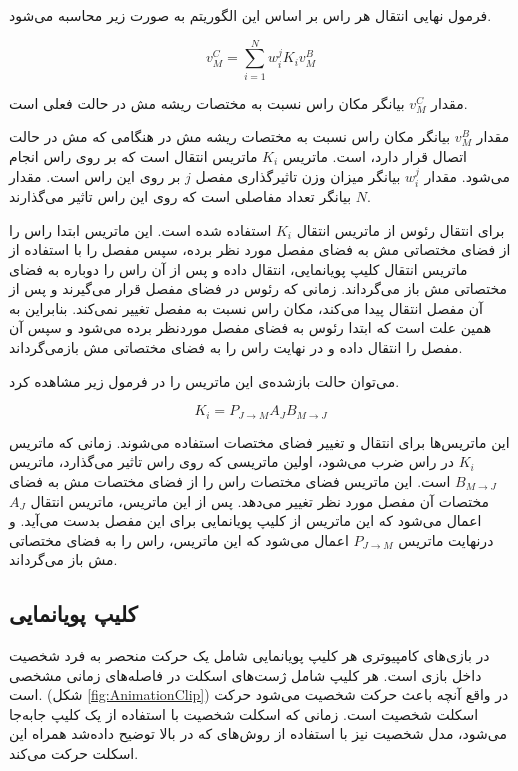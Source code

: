 فرمول نهایی انتقال هر راس بر اساس این الگوریتم به صورت زیر محاسبه می‌شود.

\[ v_M^C = \sum_{i=1}^{N} w_i^j K_i v_M^B \]


مقدار  \( v_M^C \)
بیانگر مکان راس نسبت به مختصات ریشه مش در حالت فعلی است.

مقدار  \( v_M^B \)
بیانگر مکان راس نسبت به مختصات ریشه مش در هنگامی که مش در حالت اتصال قرار دارد، است.
ماتریس \( K_i \)
ماتریس انتقال است که بر روی راس انجام می‌شود.
مقدار \( w_i^j \)
بیانگر میزان وزن تاثیرگذاری مفصل \(j\) 
بر روی این راس است.
مقدار \( N \)
بیانگر تعداد مفاصلی است که روی این راس تاثیر می‌گذارند.


برای انتقال رئوس از ماتریس انتقال \(K_i\) 
استفاده شده است.
این ماتریس ابتدا راس را از فضای مختصاتی مش به فضای مفصل مورد نظر برده، سپس مفصل را با استفاده از ماتریس انتقال کلیپ پویانمایی،
انتقال داده و پس از آن راس را دوباره به فضای مختصاتی مش باز‌ می‌گرداند.
زمانی که رئوس در فضای مفصل قرار می‌گیرند و پس از آن مفصل 
انتقال پیدا می‌کند، مکان راس نسبت به مفصل تغییر نمی‌کند.
بنابراین به همین علت است که ابتدا رئوس به فضای مفصل موردنظر برده می‌شود و سپس آن مفصل را انتقال داده و در نهایت 
راس را به فضای مختصاتی مش باز‌می‌گرداند.

می‌توان حالت باز‌شده‌ی این ماتریس را در فرمول زیر مشاهده کرد.

\[ K_i =  P_{J \rightarrow M} A_J B_{M \rightarrow J} \]

این ماتریس‌ها برای انتقال و تغییر فضای مختصات استفاده می‌شوند.
زمانی که ماتریس \(K_i\)
در راس ضرب می‌شود، اولین ماتریسی که روی راس تاثیر می‌گذارد، ماتریس 
\(B_{M \rightarrow J}\)
است. این ماتریس فضای مختصات راس را از فضای مختصات مش به فضای مختصات آن مفصل مورد نظر تغییر می‌دهد.
پس از این ماتریس، ماتریس انتقال 
\(A_J\) 
اعمال می‌شود که این ماتریس از کلیپ پویانمایی برای این مفصل بدست می‌آید.
و درنهایت ماتریس 
\(P_{J \rightarrow M}\)
اعمال می‌شود که این ماتریس، راس را به فضای مختصاتی مش باز می‌گرداند.



\subsection{کلیپ پویانمایی}
در بازی‌های کامپیوتری هر کلیپ پویانمایی شامل یک حرکت منحصر به فرد شخصیت داخل بازی است.
هر کلیپ‌ شامل ژست‌های اسکلت در فاصله‌های زمانی مشخصی است.
(شکل \ref{fig:AnimationClip})
در واقع آنچه باعث حرکت شخصیت می‌شود حرکت اسکلت شخصیت است.
زمانی که اسکلت شخصیت با استفاده از یک کلیپ جابه‌جا می‌شود، مدل شخصیت نیز با استفاده از روش‌های 
که در بالا توضیح داده‌شد همراه این اسکلت حرکت می‌کند.

